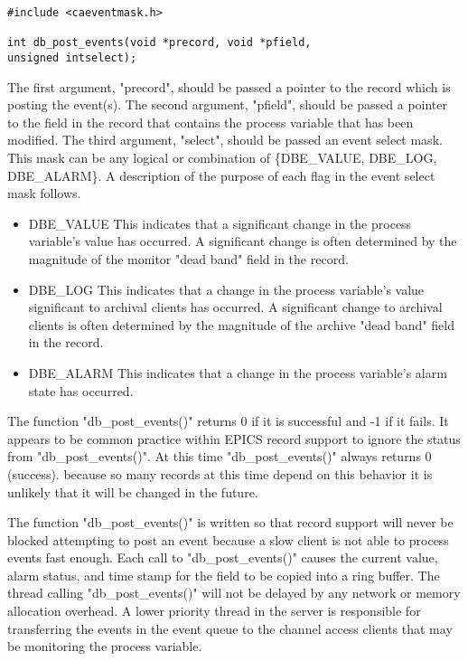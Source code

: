 \begin{verbatim}#include <caeventmask.h>

int db_post_events(void *precord, void *pfield,
unsigned intselect);
\end{verbatim}The first argument, "precord", should be passed a pointer to the record which is posting the event(s). The second 
argument, "pfield", should be passed a pointer to the field in the record that contains the process variable that has been 
modified. The third argument, "select", should be passed an event select mask. This mask can be any logical or 
combination of \{DBE\_VALUE, DBE\_LOG, DBE\_ALARM\}. A description of the purpose of each flag in the event select 
mask follows.

\begin{itemize}\item DBE\_VALUE This indicates that a significant change in the process variable's value has occurred. A significant 
change is often determined by the magnitude of the monitor "dead band" field in the record.

\item DBE\_LOG This indicates that a change in the process variable's value significant to archival clients has occurred. 
A significant change to archival clients is often determined by the magnitude of the archive "dead band" field in 
the record.

\item DBE\_ALARM This indicates that a change in the process variable's alarm state has occurred.

\end{itemize}The function "db\_post\_events()" returns 0 if it is successful and -1 if it fails. It appears to be common practice within 
EPICS record support to ignore the status from "db\_post\_events()". At this time "db\_post\_events()" always returns 0 
(success). because so many records at this time depend on this behavior it is unlikely that it will be changed in the future.

The function "db\_post\_events()" is written so that record support will never be blocked attempting to post an event 
because a slow client is not able to process events fast enough. Each call to "db\_post\_events()" causes the current value, 
alarm status, and time stamp for the field to be copied into a ring buffer. The thread calling "db\_post\_events()" will not be 
delayed by any network or memory allocation overhead. A lower priority thread in the server is responsible for 
transferring the events in the event queue to the channel access clients that may be monitoring the process variable.


